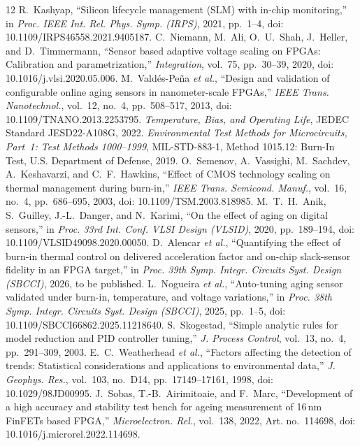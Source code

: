 \documentclass[10pt,twocolumn]{article}
\begin{document}
\renewcommand{\refname}{References}\begin{thebibliography}{12}
\footnotesize
 R.~Kashyap, ``Silicon lifecycle management (SLM) with in-chip monitoring,'' in \emph{Proc. IEEE Int. Rel. Phys. Symp. (IRPS)}, 2021, pp.~1--4, doi: 10.1109/IRPS46558.2021.9405187.
 C.~Niemann, M.~Ali, O.~U.~Shah, J.~Heller, and D.~Timmermann, ``Sensor based adaptive voltage scaling on FPGAs: Calibration and parametrization,'' \emph{Integration}, vol.~75, pp.~30--39, 2020, doi: 10.1016/j.vlsi.2020.05.006.
 M.~Vald\'es-Pe\~na \emph{et al.}, ``Design and validation of configurable online aging sensors in nanometer-scale FPGAs,'' \emph{IEEE Trans. Nanotechnol.}, vol.~12, no.~4, pp.~508--517, 2013, doi: 10.1109/TNANO.2013.2253795.
 \emph{Temperature, Bias, and Operating Life}, JEDEC Standard JESD22-A108G, 2022.
 \emph{Environmental Test Methods for Microcircuits, Part~1: Test Methods 1000--1999}, MIL-STD-883-1, Method 1015.12: Burn-In Test, U.S. Department of Defense, 2019.
 O.~Semenov, A.~Vassighi, M.~Sachdev, A.~Keshavarzi, and C.~F.~Hawkins, ``Effect of CMOS technology scaling on thermal management during burn-in,'' \emph{IEEE Trans. Semicond. Manuf.}, vol.~16, no.~4, pp.~686--695, 2003, doi: 10.1109/TSM.2003.818985.
 M.~T.~H.~Anik, S.~Guilley, J.-L.~Danger, and N.~Karimi, ``On the effect of aging on digital sensors,'' in \emph{Proc. 33rd Int. Conf. VLSI Design (VLSID)}, 2020, pp.~189--194, doi: 10.1109/VLSID49098.2020.00050.
 D.~Alencar \emph{et al.}, ``Quantifying the effect of burn-in thermal control on delivered acceleration factor and on-chip slack-sensor fidelity in an FPGA target,'' in \emph{Proc. 39th Symp. Integr. Circuits Syst. Design (SBCCI)}, 2026, to be published.
 L.~Nogueira \emph{et al.}, ``Auto-tuning aging sensor validated under burn-in, temperature, and voltage variations,'' in \emph{Proc. 38th Symp. Integr. Circuits Syst. Design (SBCCI)}, 2025, pp.~1--5, doi: 10.1109/SBCCI66862.2025.11218640.
 S.~Skogestad, ``Simple analytic rules for model reduction and PID controller tuning,'' \emph{J. Process Control}, vol.~13, no.~4, pp.~291--309, 2003.
 E.~C.~Weatherhead \emph{et al.}, ``Factors affecting the detection of trends: Statistical considerations and applications to environmental data,'' \emph{J. Geophys. Res.}, vol.~103, no.~D14, pp.~17149--17161, 1998, doi: 10.1029/98JD00995.
 J.~Sobas, T.-B.~Airimitoaie, and F.~Marc, ``Development of a high accuracy and stability test bench for ageing measurement of 16\,nm FinFETs based FPGA,'' \emph{Microelectron. Rel.}, vol.~138, 2022, Art. no.~114698, doi: 10.1016/j.microrel.2022.114698.
\end{thebibliography}
\end{document}
